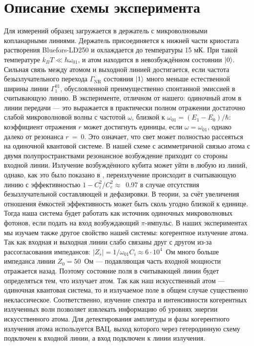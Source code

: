 \section{Описание схемы эксперимента}
Для измерений образец загружается в держатель с микроволновыми копланарными линиями. Держатель присоединяется к нижней части криостата растворения Bluefors-LD250 и охлаждается до температуры 15 мК. При такой температуре $k_B T \ll \hbar \omega_{01}$, и атом находится в невозбуждённом состоянии $\ket{0}$. Сильная связь между атомом и выходной линией достигается, если частота безызлучательного перехода $\Gamma_{\text{NR}}$ состояния $\ket{1}$ много меньше естественной ширины линии $\Gamma^{01}_{1}$, обусловленной преимущественно спонтанной эмиссией в считывающую линию. В эксперименте, отличном от нашего: одиночный атом в линии передачи \cite{Astafiev2010resonance,Delsing2013microwave1Dspace} --- это выражается в практически полном отражении достаточно слабой микроволновой волны с частотой $\omega$, близкой к $\omega_{01}=(E_1 - E_0)/\hbar$: коэффициент отражения $r$ может достигнуть единицы, если $\omega = \omega_{01}$, однако далеко от резонанса $r$~=~0. Это означает, что свет может полностью рассеяться на одиночной квантовой системе. В нашей схеме с асимметричной связью атома с двумя полупространствами резонансное возбуждение приходит со стороны входной линии. Излучение возбуждённого кубита может уйти в любую из линий, однако, как это было показано в \cite{peng2016tuneable}, переизлучение происходит в считывающую линию с эффективностью $1-C^2_{i}/C^2_{e} \approx$~0.97 в случае отсутствия безызлучательной составляющей и дефазировки. В теории, за счёт увеличения отношения ёмкостей эффективность может быть сколь угодно близкой к единице. Тогда наша система будет работать как источник одиночных микроволновых фотонов, если подать на вход возбуждающий $\pi$-импульс.
В наших экспериментах мы изучаем также другое свойство нашей системы: когерентное излучение атома. Так как входная и выходная линии слабо связаны друг с другом из-за рассогласования импедансов: $|Z_s| = 1/\omega_{01} C_{i} \approx 6 \cdot10^4$~Ом много больше импеданса линии $Z_0=50$~Ом --- подавляющая часть входной мощности отражается назад. Поэтому состояние поля в считывающей линии будет определяться тем, что излучает атом. Так как наш искусственный атом --- одиночная квантовая система, то и излучаемое поле в общем случае существенно неклассическое. Соответственно, изучение спектра и интенсивности когерентных излученных волн позволяет извлекать информацию об уровнях энергии искусственного атома. Для детектирования амплитуды и фазы когерентного излучения атома используется ВАЦ, выход которого через гетеродинную схему подключен к входной линии, а вход подключен к линии излучения.

